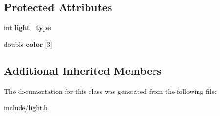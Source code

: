 \subsection*{Protected Attributes}
\begin{DoxyCompactItemize}
\item 
\mbox{\label{classLight_a54cfb73518034aede0953e3098613928}} 
int {\bfseries light\+\_\+type}
\item 
\mbox{\label{classLight_a4f195d55c72f7419de6a84beabacd7d8}} 
double {\bfseries color} \mbox{[}3\mbox{]}
\end{DoxyCompactItemize}
\subsection*{Additional Inherited Members}


The documentation for this class was generated from the following file\+:\begin{DoxyCompactItemize}
\item 
include/light.\+h\end{DoxyCompactItemize}

